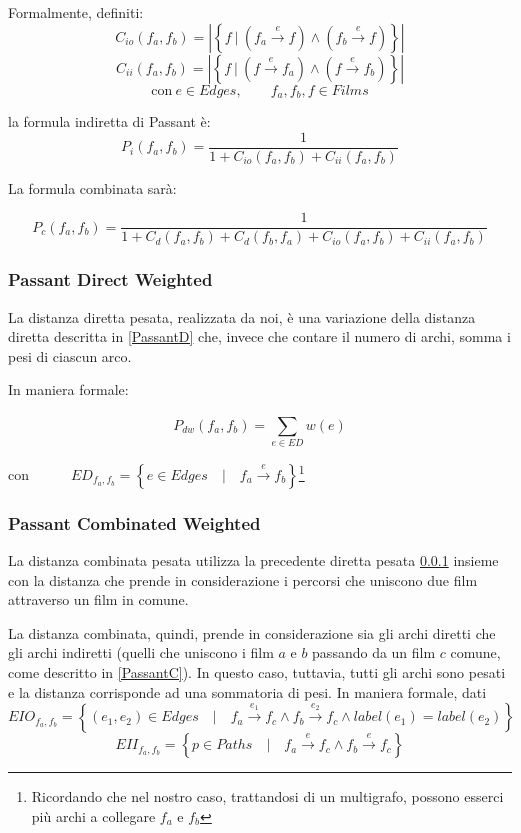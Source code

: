Formalmente, definiti:
$$C_{io}(f_a,f_b) = \left\vert \left\{ f \  | \  (f_a \xrightarrow{~e~} f ) \wedge (f_b \xrightarrow{~e~} f) \right\} \right\vert$$
$$C_{ii}(f_a,f_b) = \left\vert \left\{ f \  | \  ( f \xrightarrow{~e~} f_a ) \wedge ( f \xrightarrow{~e~} f_b) \right\} \right\vert$$ 
$$\text{con} \ e \in Edges  , \qquad f_a,f_b,f \in Films $$

la formula indiretta di Passant è:
    \begin{equation}
        P_i(f_{a},f_{b}) = \frac{1} {1+C_{io}(f_{a},f_{b})+C_{ii}(f_{a},f_{b})}
    \end{equation}

La formula combinata sarà:

    \begin{equation}
P_{c}(f_{a},f_{b}) = \frac{1} {1+C_{d}(f_{a},f_{b})+C_{d}(f_{b},f_{a})+C_{io}(f_{a},f_{b})+C_{ii}(f_{a},f_{b})}
    \end{equation}


\subsubsection{Passant Direct Weighted}
\label{PassantDW}
La distanza diretta pesata, realizzata da noi, è una variazione della distanza diretta descritta in \ref{PassantD} che, invece che contare il numero di archi, somma i pesi di ciascun arco.

In maniera formale: 

\begin{equation}
P_{dw}(f_a,f_b) = \sum\limits_{e \in ED}^{}{w(e)}
\end{equation}

con~~$ \qquad ED_{f_a,f_b} = \left\{ e \in Edges \quad\big\vert\quad f_a \xrightarrow{~e~} f_b \right\}$\footnote{Ricordando che nel nostro caso, trattandosi di un multigrafo, possono esserci più archi a collegare $f_a$ e $f_b$}

\subsubsection{Passant Combinated Weighted}
La distanza combinata pesata utilizza la precedente diretta pesata
\ref{PassantDW} insieme con la distanza che prende in considerazione i percorsi che uniscono due film attraverso un film in comune.

La distanza combinata, quindi, prende in considerazione sia gli archi diretti che gli archi indiretti (quelli che uniscono i film $a$ e $b$ passando da un film $c$ comune, come descritto in \ref{PassantC}). In questo caso, tuttavia, tutti gli archi sono pesati e la distanza corrisponde ad una sommatoria di pesi. In maniera formale, dati
$$EIO_{f_a,f_b} = \left\{ (e_1, e_2) \in Edges \quad\big\vert\quad f_a \xrightarrow{e_1} f_c \wedge f_b \xrightarrow{e_2} f_c \wedge label(e_1)=label(e_2) \right\}$$
$$EII_{f_a,f_b} = \left\{ p \in Paths \quad\big\vert\quad f_a \xrightarrow{e} f_c \wedge f_b \xrightarrow{e} f_c \right\}$$

